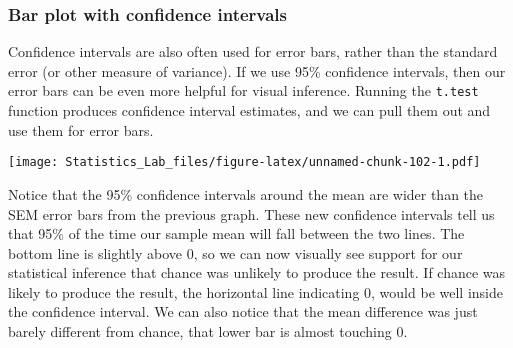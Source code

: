 \documentclass[
]{book}
\newenvironment{Shaded}{\begin{snugshade}}{\end{snugshade}}
\newcommand{\AttributeTok}[1]{\textcolor[rgb]{0.13,0.29,0.53}{#1}}
\newcommand{\DecValTok}[1]{\textcolor[rgb]{0.00,0.00,0.81}{#1}}
\newcommand{\FunctionTok}[1]{\textcolor[rgb]{0.13,0.29,0.53}{\textbf{#1}}}
\newcommand{\NormalTok}[1]{#1}
\newcommand{\OtherTok}[1]{\textcolor[rgb]{0.56,0.35,0.01}{#1}}
\newcommand{\SpecialCharTok}[1]{\textcolor[rgb]{0.81,0.36,0.00}{\textbf{#1}}}
\newcommand{\StringTok}[1]{\textcolor[rgb]{0.31,0.60,0.02}{#1}}
\begin{document}
\hypertarget{bar-plot-with-confidence-intervals}{%
\subsubsection{Bar plot with confidence intervals}\label{bar-plot-with-confidence-intervals}}

Confidence intervals are also often used for error bars, rather than the standard error (or other measure of variance). If we use 95\% confidence intervals, then our error bars can be even more helpful for visual inference. Running the \texttt{t.test} function produces confidence interval estimates, and we can pull them out and use them for error bars.

\begin{Shaded}
\end{Shaded}

\texttt{[image: Statistics\_Lab\_files/figure-latex/unnamed-chunk-102-1.pdf]}

Notice that the 95\% confidence intervals around the mean are wider than the SEM error bars from the previous graph. These new confidence intervals tell us that 95\% of the time our sample mean will fall between the two lines. The bottom line is slightly above 0, so we can now visually see support for our statistical inference that chance was unlikely to produce the result. If chance was likely to produce the result, the horizontal line indicating 0, would be well inside the confidence interval. We can also notice that the mean difference was just barely different from chance, that lower bar is almost touching 0.
\end{document}
